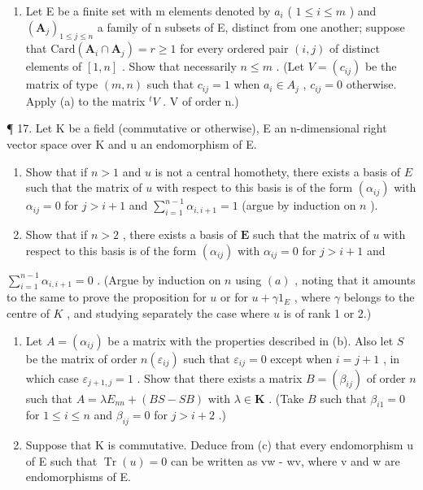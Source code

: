 \begin{enumerate}
\def\labelenumi{(\alph{enumi})}
\setcounter{enumi}{1}
\tightlist
\item
  Let E be a finite set with m elements denoted by \(a_{i}\) ( \(1 \leqslant i \leqslant m\) ) and \((\mathbf{A}_{j})_{1 \leqslant j \leqslant n}\) a family of n subsets of E, distinct from one another; suppose that \(\text{Card}(\mathbf{A}_{i} \cap \mathbf{A}_{j}) = r \geqslant 1\) for every ordered pair \((i, j)\) of distinct elements of \([1, n]\) . Show that necessarily \(n \leqslant m\) . (Let \(V = (c_{ij})\) be the matrix of type \((m, n)\) such that \(c_{ij} = 1\) when \(a_{i} \in A_{j}\) , \(c_{ij} = 0\) otherwise. Apply (a) to the matrix \(^{t}V\) . V of order n.)
\end{enumerate}

¶ 17. Let K be a field (commutative or otherwise), E an n-dimensional right vector space over K and u an endomorphism of E.

\begin{enumerate}
\def\labelenumi{(\alph{enumi})}
\item
  Show that if \(n > 1\) and \(u\) is not a central homothety, there exists a basis of \(E\) such that the matrix of \(u\) with respect to this basis is of the form \((\alpha_{ij})\) with \(\alpha_{ij} = 0\) for \(j > i + 1\) and \(\sum_{i=1}^{n-1} \alpha_{i,i+1} = 1\) (argue by induction on \(n\) ).
\item
  Show that if \(n > 2\) , there exists a basis of \(\mathbf{E}\) such that the matrix of \(u\) with respect to this basis is of the form \((\alpha_{ij})\) with \(\alpha_{ij} = 0\) for \(j > i + 1\) and
\end{enumerate}

\(\sum_{i=1}^{n-1} \alpha_{i, i+1} = 0\) . (Argue by induction on \(n\) using \((a)\) , noting that it amounts to the same to prove the proposition for \(u\) or for \(u + \gamma 1_{E}\) , where \(\gamma\) belongs to the centre of \(K\) , and studying separately the case where \(u\) is of rank 1 or 2.)

\begin{enumerate}
\def\labelenumi{(\alph{enumi})}
\setcounter{enumi}{2}
\item
  Let \(A = (\alpha_{ij})\) be a matrix with the properties described in (b). Also let \(S\) be the matrix of order \(n(\varepsilon_{ij})\) such that \(\varepsilon_{ij} = 0\) except when \(i = j + 1\) , in which case \(\varepsilon_{j+1,j} = 1\) . Show that there exists a matrix \(B = (\beta_{ij})\) of order \(n\) such that \(A = \lambda E_{nn} + (BS - SB)\) with \(\lambda \in \mathbf{K}\) . (Take \(B\) such that \(\beta_{i1} = 0\) for \(1 \leqslant i \leqslant n\) and \(\beta_{ij} = 0\) for \(j > i + 2\) .)
\item
  Suppose that K is commutative. Deduce from (c) that every endomorphism u of E such that \(\operatorname{Tr}(u) = 0\) can be written as vw - wv, where v and w are endomorphisms of E.
\end{enumerate}

